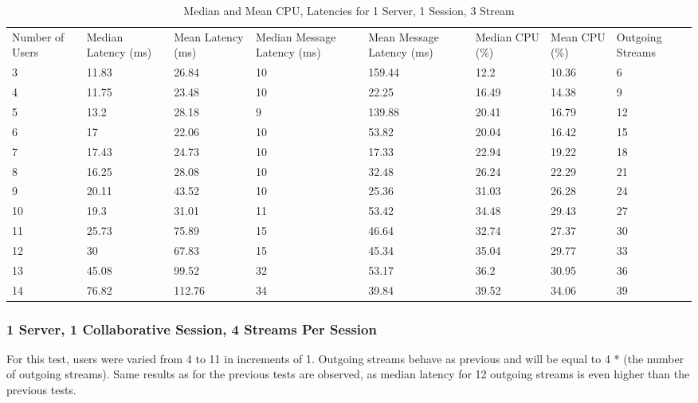 \begin{table}
\caption{Median and Mean CPU, Latencies for 1 Server, 1 Session, 3 Stream}
\label{table:1serv_1sess_3str}
\begin{tabu} to\linewidth{|X[c]|X[c]|X[c]|X[c]|X[c]|X[c]|X[c]|X[c]|}
\everyrow{\hline}
\hline
Number of Users & Median Latency (ms) & Mean Latency (ms) & Median Message Latency (ms) & Mean Message Latency (ms) & Median CPU (\%) & Mean CPU (\%) & Outgoing Streams\\
3 & 11.83 & 26.84 & 10 & 159.44 & 12.2 & 10.36 & 6 \\
4 & 11.75 & 23.48 & 10 & 22.25 & 16.49 & 14.38 & 9 \\
5 & 13.2 & 28.18 & 9 & 139.88 & 20.41 & 16.79 & 12 \\
6 & 17 & 22.06 & 10 & 53.82 & 20.04 & 16.42 & 15 \\
7 & 17.43 & 24.73 & 10 & 17.33 & 22.94 & 19.22 & 18 \\
8 & 16.25 & 28.08 & 10 & 32.48 & 26.24 & 22.29 & 21 \\
9 & 20.11 & 43.52 & 10 & 25.36 & 31.03 & 26.28 & 24 \\
10 & 19.3 & 31.01 & 11 & 53.42 & 34.48 & 29.43 & 27 \\
11 & 25.73 & 75.89 & 15 & 46.64 & 32.74 & 27.37 & 30 \\
12 & 30 & 67.83 & 15 & 45.34 & 35.04 & 29.77 & 33 \\
13 & 45.08 & 99.52 & 32 & 53.17 & 36.2 & 30.95 & 36 \\
14 & 76.82 & 112.76 & 34 & 39.84 & 39.52 & 34.06 & 39 \\
\end{tabu}
\end{table}

\clearpage\subsubsection{1 Server, 1 Collaborative Session, 4 Streams Per Session}
\label{sec:1serv_1sess_4str180}

For this test, users were varied from 4 to 11 in increments of 1. Outgoing streams behave as previous and will be equal to 4 * (the number of outgoing streams). Same results as for the previous tests are observed, as median latency for 12 outgoing streams is even higher than the previous tests.

